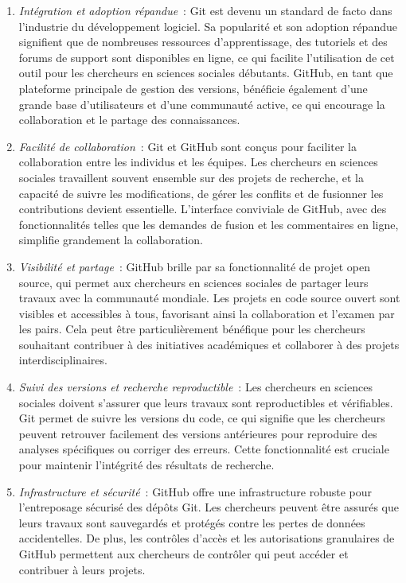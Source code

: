 \documentclass[
  letterpaper,
]{scrbook}
\begin{document}
\begin{enumerate}
\def\labelenumi{\arabic{enumi}.}
\item
  \emph{Intégration et adoption répandue}~: Git est devenu un standard
  de facto dans l'industrie du développement logiciel. Sa popularité et
  son adoption répandue signifient que de nombreuses ressources
  d'apprentissage, des tutoriels et des forums de support sont
  disponibles en ligne, ce qui facilite l'utilisation de cet outil pour
  les chercheurs en sciences sociales débutants. GitHub, en tant que
  plateforme principale de gestion des versions, bénéficie également
  d'une grande base d'utilisateurs et d'une communauté active, ce qui
  encourage la collaboration et le partage des connaissances.
\item
  \emph{Facilité de collaboration}~: Git et GitHub sont conçus pour
  faciliter la collaboration entre les individus et les équipes. Les
  chercheurs en sciences sociales travaillent souvent ensemble sur des
  projets de recherche, et la capacité de suivre les modifications, de
  gérer les conflits et de fusionner les contributions devient
  essentielle. L'interface conviviale de GitHub, avec des
  fonctionnalités telles que les demandes de fusion et les commentaires
  en ligne, simplifie grandement la collaboration.
\item
  \emph{Visibilité et partage}~: GitHub brille par sa fonctionnalité de
  projet open source, qui permet aux chercheurs en sciences sociales de
  partager leurs travaux avec la communauté mondiale. Les projets en
  code source ouvert sont visibles et accessibles à tous, favorisant
  ainsi la collaboration et l'examen par les pairs. Cela peut être
  particulièrement bénéfique pour les chercheurs souhaitant contribuer à
  des initiatives académiques et collaborer à des projets
  interdisciplinaires.
\item
  \emph{Suivi des versions et recherche reproductible}~: Les chercheurs
  en sciences sociales doivent s'assurer que leurs travaux sont
  reproductibles et vérifiables. Git permet de suivre les versions du
  code, ce qui signifie que les chercheurs peuvent retrouver facilement
  des versions antérieures pour reproduire des analyses spécifiques ou
  corriger des erreurs. Cette fonctionnalité est cruciale pour maintenir
  l'intégrité des résultats de recherche.
\item
  \emph{Infrastructure et sécurité}~: GitHub offre une infrastructure
  robuste pour l'entreposage sécurisé des dépôts Git. Les chercheurs
  peuvent être assurés que leurs travaux sont sauvegardés et protégés
  contre les pertes de données accidentelles. De plus, les contrôles
  d'accès et les autorisations granulaires de GitHub permettent aux
  chercheurs de contrôler qui peut accéder et contribuer à leurs
  projets.
\end{enumerate}
\end{document}
